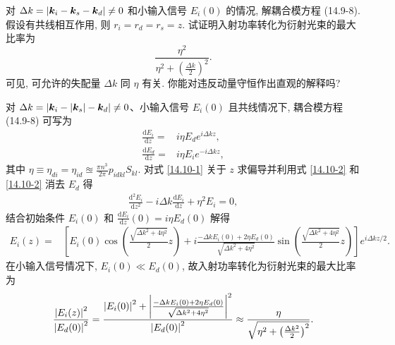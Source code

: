 \documentclass{note}
\begin{document}
\begin{exe}
    对 $\Delta k=\left\lvert\bm{k}_i-\bm{k}_s-\bm{k}_d\right\rvert\neq 0$ 和小输入信号 $E_i(0)$ 的情况, 解耦合模方程 (14.9-8). 假设有共线相互作用, 则 $r_i=r_d=r_s=z$. 试证明入射功率转化为衍射光束的最大比率为
    \[
        \frac{\eta^2}{\eta^2+\left(\frac{\Delta k}{2}\right)^2}.
    \]
    可见, 可允许的失配量 $\Delta k$ 同 $\eta$ 有关. 你能对违反动量守恒作出直观的解释吗?
\end{exe}
\begin{pf}
    对 $\Delta k=\left\lvert\bm{k}_i-\left\lvert\bm{k}_s\right\rvert-\bm{k}_d\right\rvert\neq 0$、小输入信号 $E_i(0)$ 且共线情况下, 耦合模方程 (14.9-8) 可写为
    \begin{align}
        \label{14.10-1}
        \frac{\mathrm{d}E_i}{\mathrm{d}z}=&i\eta E_de^{i\Delta kz},\\
        \label{14.10-2}
        \frac{\mathrm{d}E_d}{\mathrm{d}z}=&i\eta E_ie^{-i\Delta kz},
    \end{align}
    其中 $\eta\equiv\eta_{di}=\eta_{id}\approxeq\frac{\pi n^3}{2\pi}p_{idkl}S_{kl}$.
    对式 \eqref{14.10-1} 关于 $z$ 求偏导并利用式 \eqref{14.10-2} 和 \eqref{14.10-2} 消去 $E_d$ 得
    \begin{align}
        \frac{\mathrm{d}^2E_i}{\mathrm{d}z^2}-i\Delta k\frac{\mathrm{d}E_i}{\mathrm{d}z}+\eta^2E_i=0,
    \end{align}
    结合初始条件 $E_i(0)$ 和 $\frac{\mathrm{d}E_i}{\mathrm{d}z}(0)=i\eta E_d(0)$ 解得
    \begin{align}
        E_i(z)=&\left[E_i(0)\cos\left(\frac{\sqrt{\Delta k^2+4\eta^2}}{2}z\right)+i\frac{-\Delta kE_i(0)+2\eta E_d(0)}{\sqrt{\Delta k^2+4\eta^2}}\sin\left(\frac{\sqrt{\Delta k^2+4\eta^2}}{2}z\right)\right]e^{i\Delta kz/2}.
    \end{align}
    在小输入信号情况下, $E_i(0)\ll E_d(0)$, 故入射功率转化为衍射光束的最大比率为
    \begin{align}
        \frac{\left\lvert E_i(z)\right\rvert^2}{\left\lvert E_d(0)\right\rvert^2}=\frac{\left\lvert E_i(0)\right\rvert^2+\left\lvert\frac{-\Delta kE_i(0)+2\eta E_d(0)}{\sqrt{\Delta k^2+4\eta^2}}\right\rvert^2}{\left\lvert E_d(0)\right\rvert^2}\approx\frac{\eta}{\sqrt{\eta^2+\left(\frac{\Delta k^2}{2}\right)^2}}.
    \end{align}
\end{pf}%
\end{document}
